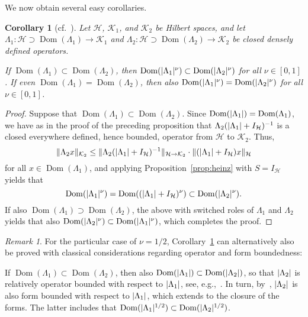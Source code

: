 \documentclass[11pt,a4paper]{amsart}
\numberwithin{equation}{section}
\DeclareMathOperator{\Dom}{Dom}
\DeclarePairedDelimiter{\abs}{|}{|}
\DeclarePairedDelimiter{\norm}{\lVert}{\rVert}
\newcommand{\cH}{{\mathcal H}}
\newcommand{\cK}{{\mathcal K}}
\theoremstyle{plain}
\newtheorem{corollary}[theorem]{Corollary}
\theoremstyle{definition}
\theoremstyle{remark}
\newtheorem{remark}[theorem]{Remark}
\begin{document}
We now obtain several easy corollaries.

\begin{corollary}[{cf.~\cite[Corollary 2.1.3]{SchmDiss}}]\label{cor:SchmDiss}
  Let $\cH$, $\cK_1$, and $\cK_2$ be Hilbert spaces, and let $\Lambda_1\colon\cH\supset\Dom(\Lambda_1)\to\cK_1$ and
  $\Lambda_2\colon\cH\supset\Dom(\Lambda_2)\to\cK_2$ be closed densely defined operators.

  If $\Dom(\Lambda_1) \subset \Dom(\Lambda_2)$, then $\Dom(\abs{\Lambda_1}^\nu) \subset \Dom(\abs{\Lambda_2}^\nu)$ for all
  $\nu \in [0,1]$. If even $\Dom(\Lambda_1) = \Dom(\Lambda_2)$, then also
  $\Dom(\abs{\Lambda_1}^\nu) = \Dom(\abs{\Lambda_2}^\nu)$ for all $\nu \in [0,1]$.
\end{corollary}

\begin{proof}
  Suppose that $\Dom(\Lambda_1) \subset \Dom(\Lambda_2)$. Since $\Dom(\abs{\Lambda_1}) = \Dom(\Lambda_1)$, we have as in the
  proof of the preceding proposition that $\Lambda_2(\abs{\Lambda_1}+I_\cH)^{-1}$ is a closed everywhere defined, hence bounded,
  operator from $\cH$ to $\cK_2$. Thus,
  \begin{equation*}
    \norm{\Lambda_2x}_{\cK_2}
    \le
    \norm{\Lambda_2(\abs{\Lambda_1}+I_\cH)^{-1}}_{\cH\to\cK_2} \cdot \norm{(\abs{\Lambda_1}+I_\cH)x}_{\cH}
  \end{equation*}
  for all $x\in\Dom(\Lambda_1)$, and applying Proposition~\ref{prop:heinz} with $S=I_\cH$ yields that
  \begin{equation*}
    \Dom(\abs{\Lambda_1}^\nu)
    =
    \Dom((\abs{\Lambda_1}+I_\cH)^\nu)\subset\Dom(\abs{\Lambda_2}^\nu)
    .
  \end{equation*}
  If also $\Dom(\Lambda_1) \supset \Dom(\Lambda_2)$, the above with switched roles of $\Lambda_1$ and $\Lambda_2$ yields that
  also $\Dom(\abs{\Lambda_2}^\nu) \subset \Dom(\abs{\Lambda_1}^\nu)$, which completes the proof.
\end{proof}%

\begin{remark}\label{rem:SchmDiss}
  For the particular case of $\nu = 1/2$, Corollary~\ref{cor:SchmDiss} can alternatively also be proved with classical
  considerations regarding operator and form boundedness:

  If $\Dom(\Lambda_1) \subset \Dom(\Lambda_2)$, then also $\Dom(\abs{\Lambda_1}) \subset \Dom(\abs{\Lambda_2})$, so that
  $\abs{\Lambda_2}$ is relatively operator bounded with respect to $\abs{\Lambda_1}$, see, e.g.,~\cite[Remark~IV.1.5]{Kato95}. In
  turn, by~\cite[Theorem~VI.1.38]{Kato95}, $\abs{\Lambda_2}$ is also form bounded with respect to $\abs{\Lambda_1}$, which
  extends to the closure of the forms. The latter includes that
  $\Dom(\abs{\Lambda_1}^{1/2}) \subset \Dom(\abs{\Lambda_2}^{1/2})$.
\end{remark}
\end{document}
